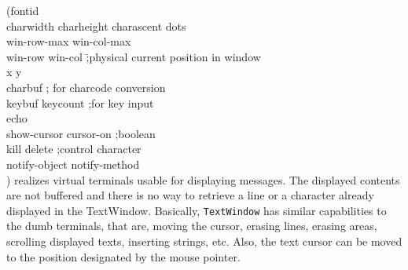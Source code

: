\begin{refdesc}
{(fontid \\
\>charwidth charheight charascent dots \\
\>win-row-max win-col-max \\
\>win-row win-col \hspace{20mm} \= ;physical current position in window \\
\>x y\\
\>charbuf \>; for charcode conversion \\
\>keybuf keycount \> ;for key input\\
\>echo \\
\>show-cursor cursor-on \> ;boolean\\
\>kill delete \> ;control character \\
\>notify-object notify-method \\
\>)}{
realizes virtual terminals usable for displaying messages.
The displayed contents are not buffered and there is no way to retrieve
a line or a character already displayed in the TextWindow.
Basically, {\tt TextWindow} has similar capabilities to the dumb terminals,
that are, moving the cursor, erasing lines, erasing areas,
scrolling displayed texts, inserting strings, etc.
Also, the text cursor can be moved to the position designated by 
the mouse pointer.}






\end{refdesc}
